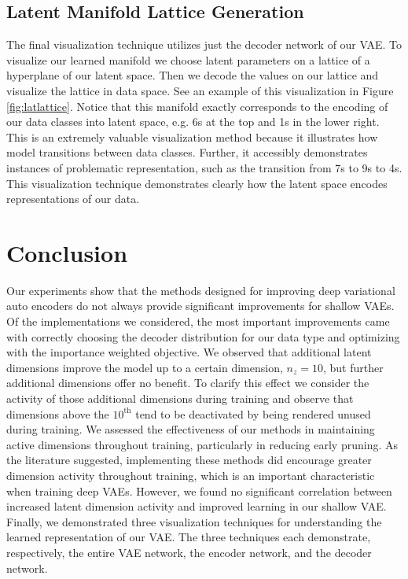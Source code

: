 \documentclass{article} %
\numberwithin{figure}{section}
\begin{document}
\subsection{Latent Manifold Lattice Generation}
The final visualization technique utilizes just the decoder network of our VAE. To visualize our learned manifold we choose latent parameters on a lattice of a hyperplane of our latent space. Then we decode the values on our lattice and visualize the lattice in data space. See an example of this visualization in Figure \ref{fig:latlattice}. Notice that this manifold exactly corresponds to the encoding of our data classes into latent space, e.g. 6s at the top and 1s in the lower right. This is an extremely valuable visualization method because it illustrates how model transitions between data classes. Further, it accessibly demonstrates instances of problematic representation, such as the transition from 7s to 9s to 4s. This visualization technique demonstrates clearly how the latent space encodes representations of our data.
\begin{wrapfigure}[22]{l}{0.5\textwidth}
    }
    \caption{Latent Manifold Visualization}
    \label{fig:latlattice}
\end{wrapfigure}
\section{Conclusion}
Our experiments show that the methods designed for improving deep variational auto encoders do not always provide significant improvements for shallow VAEs. Of the implementations we considered, the most important improvements came with correctly choosing the decoder distribution for our data type and optimizing with the importance weighted objective. We observed that additional latent dimensions improve the model up to a certain dimension, $n_z=10$, but further additional dimensions offer no benefit. To clarify this effect we consider the activity of those additional dimensions during training and observe that dimensions above the $10^{\text{th}}$ tend to be deactivated by being rendered unused during training. We assessed the effectiveness of our methods in maintaining active dimensions throughout training, particularly in reducing early pruning. As the literature suggested, implementing these methods did encourage greater dimension activity throughout training, which is an important characteristic when training deep VAEs. However, we found no significant correlation between increased latent dimension activity and improved learning in our shallow VAE. Finally, we demonstrated three visualization techniques for understanding the learned representation of our VAE. The three techniques each demonstrate, respectively, the entire VAE network, the encoder network, and the decoder network. 
\end{document}
